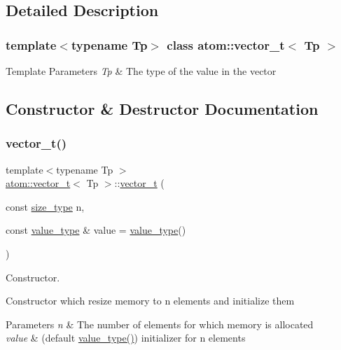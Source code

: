 \subsection{Detailed Description}
\subsubsection*{template$<$typename Tp$>$\newline
class atom\+::vector\+\_\+t$<$ Tp $>$}


\begin{DoxyTemplParams}{Template Parameters}
{\em Tp} & The type of the value in the vector \\
\hline
\end{DoxyTemplParams}


\subsection{Constructor \& Destructor Documentation}
\mbox{\label{classatom_1_1vector__t_a6c045495ebfcd53b4d91d9c76ceb5fdf}} 
\subsubsection{\texorpdfstring{vector\+\_\+t()}{vector\_t()}\hspace{0.1cm}{\footnotesize\ttfamily [1/3]}}
{\footnotesize\ttfamily template$<$typename Tp $>$ \\
\hyperlink{classatom_1_1vector__t}{atom\+::vector\+\_\+t}$<$ Tp $>$\+::\hyperlink{classatom_1_1vector__t}{vector\+\_\+t} (\begin{DoxyParamCaption}\item[{const \hyperlink{classatom_1_1vector__t_a1790d79321f4fa8d2580474dd0f56033}{size\+\_\+type}}]{n,  }\item[{const \hyperlink{classatom_1_1vector__t_a558283a4fed53856d445ceb61ac96d94}{value\+\_\+type} \&}]{value = {\ttfamily \hyperlink{classatom_1_1vector__t_a558283a4fed53856d445ceb61ac96d94}{value\+\_\+type}()} }\end{DoxyParamCaption})\hspace{0.3cm}{\ttfamily [inline]}}



Constructor. 

Constructor which resize memory to n elements and initialize them 
\begin{DoxyParams}{Parameters}
{\em n} & The number of elements for which memory is allocated \\
\hline
{\em value} & (default \hyperlink{classatom_1_1vector__t_a558283a4fed53856d445ceb61ac96d94}{value\+\_\+type()}) initializer for n elements \\
\hline
\end{DoxyParams}

